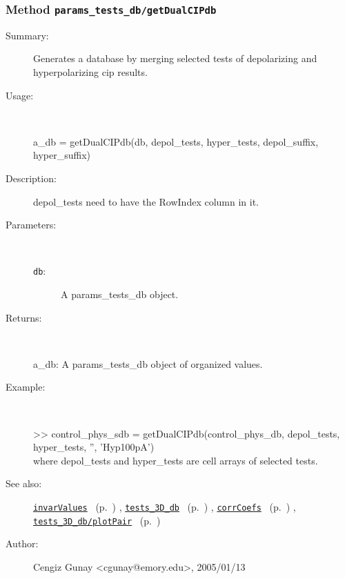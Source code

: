\subsubsection[Method \texttt{getDualCIPdb}]{Method \texttt{params\_tests\_db/getDualCIPdb}}%
%
\label{ref_params_tests_db__getDualCIPdb}%
\hypertarget{ref_params_tests_db__getDualCIPdb}{}%
\begin{description}
\item[Summary:]Generates a database by merging selected tests of depolarizing and hyperpolarizing cip results.
%
\item[Usage:]~%
\begin{lyxcode}%
a\_db = getDualCIPdb(db, depol\_tests, hyper\_tests, depol\_suffix, hyper\_suffix)
%
\end{lyxcode}%
%
\item[Description:]%
depol\_tests need to have the RowIndex column in it.
\item[Parameters:]~
\begin{description}%
\item[\texttt{db}:]
 A params\_tests\_db object.
\end{description}%
%
\item[Returns:]~

	a\_db: A params\_tests\_db object of organized values.
%
\item[Example:]~
\begin{lyxcode}        >> control\_phys\_sdb = getDualCIPdb(control\_phys\_db, depol\_tests, hyper\_tests, '', 'Hyp100pA')\\%
        where depol\_tests and hyper\_tests are cell arrays of selected tests.\\%
\end{lyxcode}
%
\item[See also:]%
\hyperlink{ref_invarValues}{\texttt{invarValues}}%
\ (p.~\pageref{ref_invarValues})%
%
, \hyperlink{ref_tests_3D_db}{\texttt{tests\_3D\_db}}%
\ (p.~\pageref{ref_tests_3D_db})%
%
, \hyperlink{ref_corrCoefs}{\texttt{corrCoefs}}%
\ (p.~\pageref{ref_corrCoefs})%
%
, \hyperlink{ref_tests_3D_db__plotPair}{\texttt{tests\_3D\_db/plotPair}}%
\ (p.~\pageref{ref_tests_3D_db__plotPair})%
%
%
\item[Author:]%
Cengiz Gunay <cgunay@emory.edu>, 2005/01/13%
\end{description}
\methodline%
